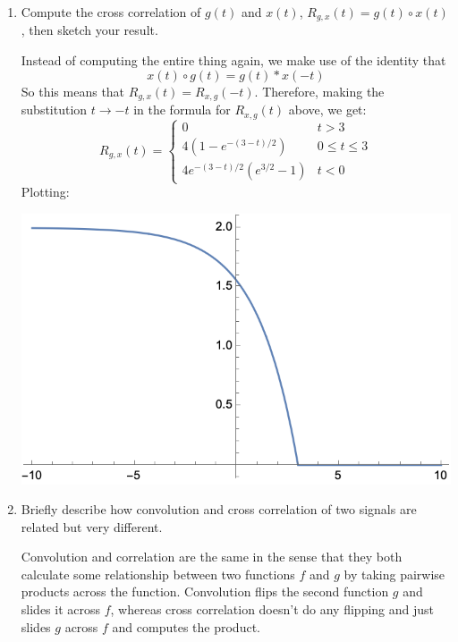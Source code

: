 \documentclass[10pt]{article}
\begin{document}
\begin{enumerate}[label=\alph*)]
\begin{solution}
\begin{center}
				\end{center}
			\end{solution}
		\item Compute the cross correlation of \( g(t) \) and \( x(t) \), \( R_{g, x}(t) = g(t) \circ x(t) \), then 
			sketch your result. 

			\begin{solution}
				Instead of computing the entire thing again, we make use of the identity that 
				\[
				x(t) \circ g(t) = g(t) * x(-t)
				\] 
				So this means that \( R_{g, x}(t) = R_{x, g}(-t) \). Therefore, making the substitution 
				\( t \to -t \) in the formula for \( R_{x, g}(t) \) above, we get: 
				\[
				R_{g, x}(t) = \begin{cases}
					0 & t > 3\\
					4(1 - e^{-(3 - t) /2}) & 0 \le t \le 3\\
					4e^{-(3 - t) /2}(e^{3 /2} - 1) & t < 0
				\end{cases}
				\] 
				Plotting: 
				\begin{center}
					\includegraphics{q7c.png}
				\end{center}
			\end{solution}
		\item Briefly describe how convolution and cross correlation of two signals are related but very different.  

			\begin{solution}
				Convolution and correlation are the same in the sense that they both calculate some relationship 
				between two functions \( f \) and \( g \) by taking pairwise products across the function. 
				Convolution flips the second function \( g \) and slides it across \( f \), whereas cross correlation 
				doesn't do any flipping and just slides \( g \) across \( f \) and computes the product. 
			\end{solution}
	\end{enumerate}
\end{document}
